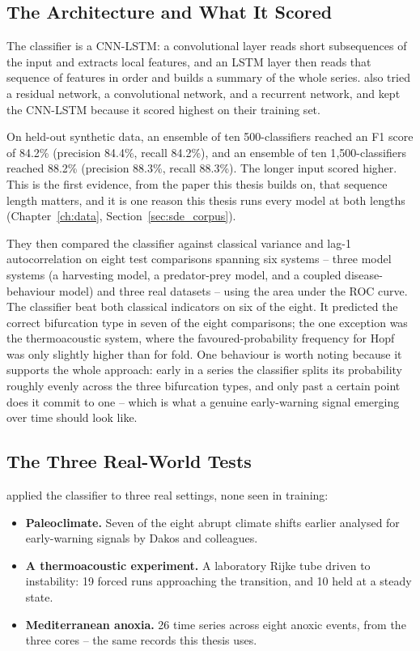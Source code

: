 \subsection{The Architecture and What It Scored}
The classifier is a CNN-LSTM: a convolutional layer reads short subsequences of the input and extracts local features, and an LSTM layer then reads that sequence of features in order and builds a summary of the whole series. \citet{bury2021} also tried a residual network, a convolutional network, and a recurrent network, and kept the CNN-LSTM because it scored highest on their training set.

On held-out synthetic data, an ensemble of ten 500-classifiers reached an F1 score of 84.2\% (precision 84.4\%, recall 84.2\%), and an ensemble of ten 1{,}500-classifiers reached 88.2\% (precision 88.3\%, recall 88.3\%). The longer input scored higher. This is the first evidence, from the paper this thesis builds on, that sequence length matters, and it is one reason this thesis runs every model at both lengths (Chapter~\ref{ch:data}, Section~\ref{sec:sde_corpus}).

They then compared the classifier against classical variance and lag-1 autocorrelation on eight test comparisons spanning six systems -- three model systems (a harvesting model, a predator-prey model, and a coupled disease-behaviour model) and three real datasets -- using the area under the ROC curve. The classifier beat both classical indicators on six of the eight. It predicted the correct bifurcation type in seven of the eight comparisons; the one exception was the thermoacoustic system, where the favoured-probability frequency for Hopf was only slightly higher than for fold. One behaviour is worth noting because it supports the whole approach: early in a series the classifier splits its probability roughly evenly across the three bifurcation types, and only past a certain point does it commit to one -- which is what a genuine early-warning signal emerging over time should look like.

\subsection{The Three Real-World Tests}
\citet{bury2021} applied the classifier to three real settings, none seen in training:

\begin{itemize}
  \item \textbf{Paleoclimate.} Seven of the eight abrupt climate shifts earlier analysed for early-warning signals by Dakos and colleagues.
  \item \textbf{A thermoacoustic experiment.} A laboratory Rijke tube driven to instability: 19 forced runs approaching the transition, and 10 held at a steady state.
  \item \textbf{Mediterranean anoxia.} 26 time series across eight anoxic events, from the three \citet{hennekam2020} cores -- the same records this thesis uses.
\end{itemize}

